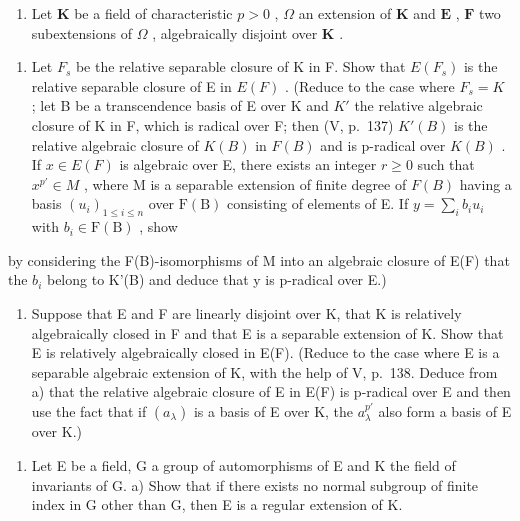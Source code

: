 \begin{enumerate}
\def\labelenumi{\arabic{enumi})}
\setcounter{enumi}{1}
\tightlist
\item
  Let \(\mathbf{K}\) be a field of characteristic \(p > 0\) , \(\Omega\) an extension of \(\mathbf{K}\) and \(\mathbf{E}\) , \(\mathbf{F}\) two subextensions of \(\Omega\) , algebraically disjoint over \(\mathbf{K}\) .
\end{enumerate}

\begin{enumerate}
\def\labelenumi{\alph{enumi})}
\tightlist
\item
  Let \(F_{s}\) be the relative separable closure of K in F. Show that \(E(F_{s})\) is the relative separable closure of E in \(E(F)\) . (Reduce to the case where \(F_{s}=K\) ; let B be a transcendence basis of E over K and \(K'\) the relative algebraic closure of K in F, which is radical over F; then (V, p.~137) \(K'(B)\) is the relative algebraic closure of \(K(B)\) in \(F(B)\) and is p-radical over \(K(B)\) . If \(x\in E(F)\) is algebraic over E, there exists an integer \(r\geqslant0\) such that \(x^{p'}\in M\) , where M is a separable extension of finite degree of \(F(B)\) having a basis \((u_{i})_{1\leqslant i\leqslant n}\) over \(\mathrm{F(B)}\) consisting of elements of E. If \(y = \sum_{i}b_{i}u_{i}\) with \(b_{i}\in \mathrm{F(B)}\) , show
\end{enumerate}

by considering the F(B)-isomorphisms of M into an algebraic closure of E(F) that the \(b_{i}\) belong to K'(B) and deduce that y is p-radical over E.)

\begin{enumerate}
\def\labelenumi{\alph{enumi})}
\setcounter{enumi}{1}
\tightlist
\item
  Suppose that E and F are linearly disjoint over K, that K is relatively algebraically closed in F and that E is a separable extension of K. Show that E is relatively algebraically closed in E(F). (Reduce to the case where E is a separable algebraic extension of K, with the help of V, p.~138. Deduce from a) that the relative algebraic closure of E in E(F) is p-radical over E and then use the fact that if \((a_{\lambda})\) is a basis of E over K, the \(a_{\lambda}^{p'}\) also form a basis of E over K.)
\end{enumerate}

\begin{enumerate}
\def\labelenumi{\arabic{enumi})}
\setcounter{enumi}{2}
\tightlist
\item
  Let E be a field, G a group of automorphisms of E and K the field of invariants of G. a) Show that if there exists no normal subgroup of finite index in G other than G, then E is a regular extension of K.
\end{enumerate}

